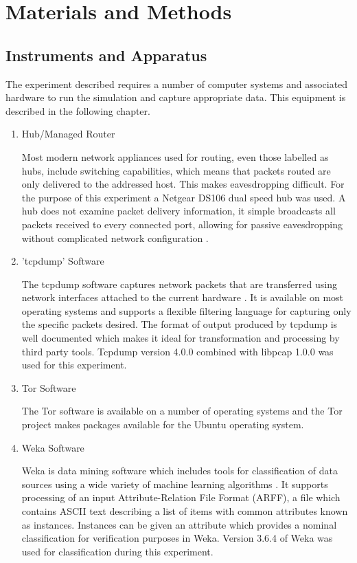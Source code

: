 
\chapter{Materials and Methods}

\section{Instruments and Apparatus}

The experiment described requires a number of computer systems and associated
hardware to run the simulation and capture appropriate data. This equipment is
described in the following chapter.

\begin{enumerate}
  \item Hub/Managed Router

  Most modern network appliances used for routing, even those labelled as hubs,
  include switching capabilities, which means that packets routed are only
  delivered to the addressed host. This makes eavesdropping difficult. For
  the purpose of this experiment a Netgear DS106 dual speed hub was used. A hub
  does not examine packet delivery information, it simple broadcasts all packets
  received to every connected port, allowing for passive eavesdropping without
  complicated network configuration \parencite{website:hub-reference}.

  \item 'tcpdump' Software

  The tcpdump software captures network packets that are transferred using
  network interfaces attached to the current hardware \parencite{:2009cr}.  It is
  available on most operating systems and supports a flexible filtering language
  for capturing only the specific packets desired. The format of output produced
  by tcpdump is well documented \parencite{:nx} which makes it ideal for
  transformation and processing by third party tools. Tcpdump version 4.0.0
  combined with libpcap 1.0.0 was used for this experiment.

  \item Tor Software

  The Tor software is available on a number of operating systems and the Tor
  project makes packages available for the Ubuntu operating system.

  \item Weka Software

  Weka is data mining software which includes tools for classification of data
  sources using a wide variety of machine learning algorithms
  \parencite{Hall:2009p7662,Bouckaert:2010we}. It supports processing of an
  input Attribute-Relation File Format (ARFF), a file which contains ASCII text
  describing a list of items with common attributes known as instances.
  Instances can be given an attribute which provides a nominal classification
  for verification purposes in Weka. Version 3.6.4 of Weka was used for
  classification during this experiment.


\end{enumerate}

